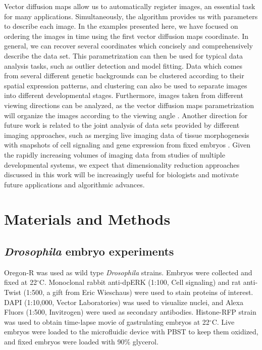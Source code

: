 \documentclass[twocolumn, 10pt]{article}
\begin{document}
%
Vector diffusion maps allow us to automatically register images, an essential task for many applications.
%
Simultaneously, the algorithm provides us with parameters to describe each image.
%
In the examples presented here, we have focused on ordering the images in time using the first vector diffusion maps coordinate.
%
In general, we can recover several coordinates which concisely and comprehensively describe the data set.
%
This parametrization can then be used for typical data analysis tasks, such as outlier detection and model fitting.
%
Data which comes from several different genetic backgrounds can be clustered according to their spatial expression patterns, and clustering can also be used to separate images into different developmental stages.
%
Furthermore, images taken from different viewing directions can be analyzed, as the vector diffusion maps parametrization will organize the images according to the viewing angle \citep{singer2011viewing}.
%
Another direction for future work is related to the joint analysis of data sets provided by different imaging approaches, such as merging live imaging data of tissue morphogenesis with snapshots of cell signaling and gene expression from fixed embryos \citep{krzic2012multiview, ichikawa2014live, rubel2010coupling, dsilva2013nonlinear}.
%
Given the rapidly increasing volumes of imaging data from studies of multiple developmental systems, we expect that dimensionality reduction approaches discussed in this work will be increasingly useful for biologists and motivate future applications and algorithmic advances.






\section*{Materials and Methods}

\subsection*{{\em Drosophila} embryo experiments}
%
Oregon-R was used as wild type {\em Drosophila} strains.
%
Embryos were collected and fixed at 22$^\circ$C.
%
Monoclonal rabbit anti-dpERK (1:100, Cell signaling) and rat anti-Twist (1:500, a gift from Eric Wieschaus) were used to stain proteins of interest.
%
DAPI (1:10,000, Vector Laboratories) was used to visualize nuclei, and Alexa Fluors (1:500, Invitrogen) were used as secondary antibodies.
%
Histone-RFP strain was used to obtain time-lapse movie of gastrulating embryos at 22$^\circ$C.
%
Live embryos were loaded to the microfluidic device with PBST to keep them oxidized, and fixed embryos were loaded with 90\% glycerol.
\end{document}
